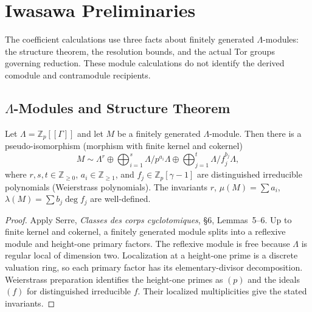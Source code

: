 \section{Iwasawa Preliminaries}
\label{v4-arith:pos:iwasawa-preliminaries}

The coefficient calculations use three facts about finitely
generated \(\Lambda\)-modules:
the structure theorem, the resolution bounds, and the actual
Tor groups governing reduction. These module calculations do not
identify the derived comodule and contramodule recipients.

\subsection{\texorpdfstring{\(\Lambda\)}{Lambda}-Modules and Structure Theorem}
\label{v4-arith:pos:lambda-modules}

\begin{proposition}
\label{v4-arith:pos:prop:lambda-structure}
Let \(\Lambda=\mathbb{Z}_{p}[[\Gamma]]\)
and let \(M\) be a finitely generated \(\Lambda\)-module. Then
there is a pseudo-isomorphism (morphism with finite kernel and
cokernel)
\begin{equation}
M\sim \Lambda^{r}\oplus\bigoplus_{i=1}^{s}\Lambda/p^{a_{i}}\Lambda\oplus\bigoplus_{j=1}^{t}\Lambda/f_{j}^{b_{j}}\Lambda,
\end{equation}
where \(r,s,t\in\mathbb{Z}_{\geq 0}\), \(a_{i}\in\mathbb{Z}_{\geq 1}\),
and \(f_{j}\in\mathbb{Z}_{p}[\gamma-1]\) are distinguished
irreducible polynomials (Weierstrass polynomials). The invariants
\(r\), \(\mu(M)=\sum a_{i}\), \(\lambda(M)=\sum b_{j}\deg f_{j}\) are
well-defined.
\end{proposition}

\begin{proof}
Apply Serre, \emph{Classes des corps cyclotomiques}, \S6,
Lemmas~5--6. Up to finite kernel and cokernel, a finitely
generated module splits into a reflexive module and height-one
primary factors. The reflexive module is free because \(\Lambda\)
is regular local of dimension two. Localization at a height-one
prime is a discrete valuation ring, so each primary factor has
its elementary-divisor decomposition. Weierstrass preparation
identifies the height-one primes as \((p)\) and the ideals
\((f)\) for distinguished irreducible \(f\).
Their localized multiplicities give the stated invariants.
\end{proof}


